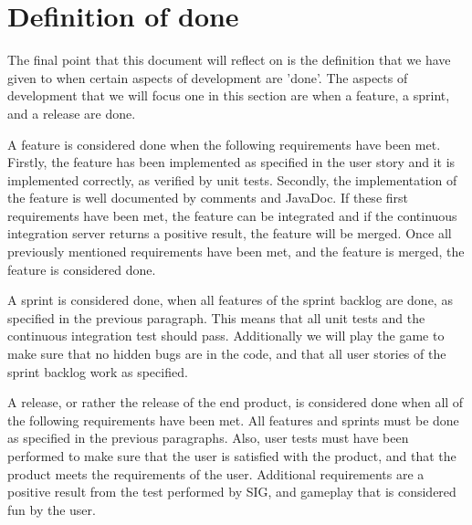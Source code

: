 \documentclass{article}
\begin{document}
\section{Definition of done}
The final point that this document will reflect on is the definition that we have given to when certain aspects of development are 'done'. The aspects of development that we will focus one in this section are when a feature, a sprint, and a release are done.

A feature is considered done when the following requirements have been met. Firstly, the feature has been implemented as specified in the user story and it is implemented correctly, as verified by unit tests. Secondly, the implementation of the feature is well documented by comments and JavaDoc. If these first requirements have been met, the feature can be integrated and if the continuous integration server returns a positive result, the feature will be merged. Once all previously mentioned requirements have been met, and the feature is merged, the feature is considered done.

A sprint is considered done, when all features of the sprint backlog are done, as specified in the previous paragraph. This means that all unit tests and the continuous integration test should pass. Additionally we will play the game to make sure that no hidden bugs are in the code, and that all user stories of the sprint backlog work as specified.

A release, or rather the release of the end product, is considered done when all of the following requirements have been met. All features and sprints must be done as specified in the previous paragraphs. Also, user tests must have been performed to make sure that the user is satisfied with the product, and that the product meets the requirements of the user. Additional requirements are a positive result from the test performed by SIG, and gameplay that is considered fun by the user.
\pagebreak
\end{document}
